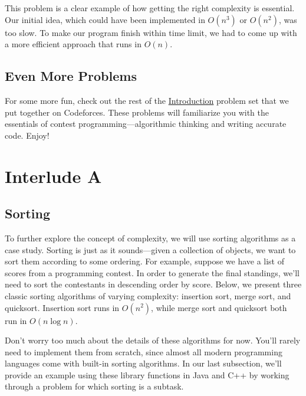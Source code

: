 This problem is a clear example of how getting the right complexity is essential. Our initial idea, which could have been implemented in $O(n^3)$ or $O(n^2)$, was too slow. To make our program finish within time limit, we had to come up with a more efficient approach that runs in $O(n)$.

\section{Even More Problems}

For some more fun, check out the rest of the \href{http://codeforces.com/group/5tN48zOVvQ/contest/204614}{Introduction} problem set that we put together on Codeforces. These problems will familiarize you with the essentials of contest programming---algorithmic thinking and writing accurate code. Enjoy!

\begingroup
\chapter*{Interlude A}

\section{Sorting}

To further explore the concept of complexity, we will use sorting algorithms as a case study. Sorting is just as it sounds---given a collection of objects, we want to sort them according to some ordering. For example, suppose we have a list of scores from a programming contest. In order to generate the final standings, we'll need to sort the contestants in descending order by score. Below, we present three classic sorting algorithms of varying complexity: insertion sort, merge sort, and quicksort. Insertion sort runs in $O(n^2)$, while merge sort and quicksort both run in $O(n\log n)$.

Don't worry too much about the details of these algorithms for now. You'll rarely need to implement them from scratch, since almost all modern programming languages come with built-in sorting algorithms. In our last subsection, we'll provide an example using these library functions in Java and C++ by working through a problem for which sorting is a subtask.


